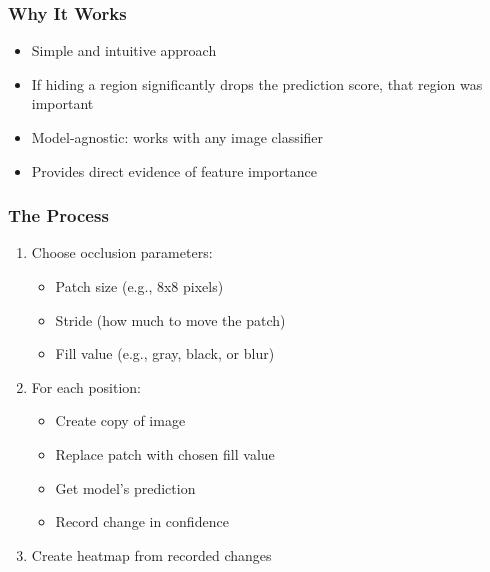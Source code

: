 \documentclass{article}
\begin{document}
\subsubsection{Why It Works}
\begin{itemize}
    \item Simple and intuitive approach
    \item If hiding a region significantly drops the prediction score, that region was important
    \item Model-agnostic: works with any image classifier
    \item Provides direct evidence of feature importance
\end{itemize}

\subsubsection{The Process}
\begin{enumerate}
    \item Choose occlusion parameters:
        \begin{itemize}
            \item Patch size (e.g., 8x8 pixels)
            \item Stride (how much to move the patch)
            \item Fill value (e.g., gray, black, or blur)
        \end{itemize}
    \item For each position:
        \begin{itemize}
            \item Create copy of image
            \item Replace patch with chosen fill value
            \item Get model's prediction
            \item Record change in confidence
        \end{itemize}
    \item Create heatmap from recorded changes
\end{enumerate}
\end{document}
